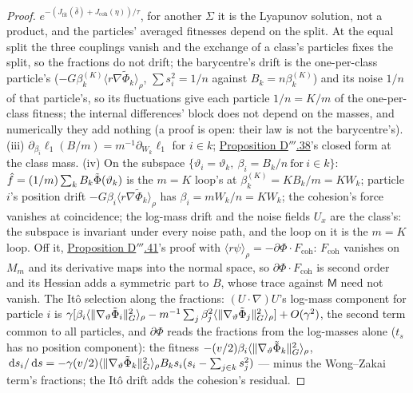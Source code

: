 \begin{proof}
$e^{-(J_{\mathrm{fit}}(\bar\delta) + J_{\mathrm{coh}}(\eta))/\tau}$, for another $\Sigma$ it is the Lyapunov solution,
not a product, and the particles' averaged fitnesses depend on the split. At the equal split the three couplings vanish
and the exchange of a class's particles fixes the split, so the fractions do not drift; the barycentre's drift is the
one-per-class particle's ($-G\beta_k^{(K)}\langle r\nabla\tilde\Phi_k\rangle_\rho$, $\sum s_i^2 = 1/n$ against
$B_k = n\beta_k^{(K)}$) and its noise $1/n$ of that particle's, so its fluctuations give each particle $1/n = K/m$ of
the one-per-class fitness; the internal differences' block does not depend on the masses, and numerically they add
nothing (a proof is open: their law is not the barycentre's). (iii)
$\partial_{\beta_i}\ell_1(B/m) = m^{-1}\partial_{W_k}\ell_1$ for $i\in k$;
\hyperref[res:thmDppp:38]{Proposition D$'''$.38}'s closed form at the class mass. (iv) On the subspace
$\{\vartheta_i = \vartheta_k,\ \beta_i = B_k/n\ \text{for}\ i\in k\}$: $\hat f = (1/m)\sum_kB_k\tilde\Phi(\vartheta_k)$ is
the $m = K$ loop's at $\beta_k^{(K)} = KB_k/m = KW_k$; particle $i$'s position drift
$-G\beta_i\langle r\nabla\tilde\Phi_k\rangle_\rho$ has $\beta_i = mW_k/n = KW_k$; the cohesion's force vanishes at
coincidence; the log-mass drift and the noise fields $U_x$ are the class's: the subspace is invariant under every noise
path, and the loop on it is the $m = K$ loop. Off it, \hyperref[res:thmDppp:41]{Proposition D$'''$.41}'s proof with
$\langle r\psi\rangle_\rho = -\partial\Phi\cdot F_{\mathrm{coh}}$: $F_{\mathrm{coh}}$ vanishes on $M_m$ and its
derivative maps into the normal space, so $\partial\Phi\cdot F_{\mathrm{coh}}$ is second order and its Hessian adds a
symmetric part to $B$, whose trace against $\mathsf M$ need not vanish. The It\^o selection along the fractions:
$(U\cdot\nabla)U$'s log-mass component for particle $i$ is
$\gamma[\beta_i\langle\lVert \nabla_\vartheta\tilde\Phi_i\rVert^2_G\rangle_\rho
- m^{-1}\sum_j\beta_j^2\langle\lVert \nabla_\vartheta\tilde\Phi_j\rVert^2_G\rangle_\rho] + O(\gamma^2)$, the second term common
to all particles, and $\partial\Phi$ reads the fractions from the log-masses alone ($t_s$ has no position component): the
fitness $-(v/2)\beta_i\langle\lVert \nabla_\vartheta\tilde\Phi_k\rVert^2_G\rangle_\rho$,
$\,\mathrm{d} s_i/\,\mathrm{d} s = -\gamma(v/2)\langle\lVert \nabla_\vartheta\tilde\Phi_k\rVert^2_G\rangle_\rho B_ks_i(s_i - \sum_{j\in k}s_j^2)$
--- minus the Wong--Zakai term's fractions; the It\^o drift adds the cohesion's residual.
\end{proof}
